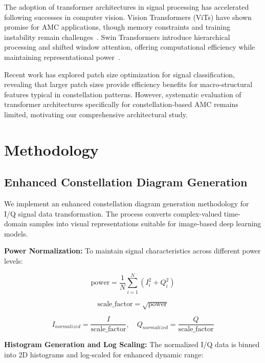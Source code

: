 \documentclass{ELSP}
\begin{document}
The adoption of transformer architectures in signal processing has accelerated following successes in computer vision. Vision Transformers (ViTs) have shown promise for AMC applications, though memory constraints and training instability remain challenges~\cite{vit2020}. Swin Transformers introduce hierarchical processing and shifted window attention, offering computational efficiency while maintaining representational power~\cite{swin2021}.

Recent work has explored patch size optimization for signal classification, revealing that larger patch sizes provide efficiency benefits for macro-structural features typical in constellation patterns. However, systematic evaluation of transformer architectures specifically for constellation-based AMC remains limited, motivating our comprehensive architectural study.

\section{Methodology}

\subsection{Enhanced Constellation Diagram Generation}

We implement an enhanced constellation diagram generation methodology for I/Q signal data transformation. The process converts complex-valued time-domain samples into visual representations suitable for image-based deep learning models.

\textbf{Power Normalization:} To maintain signal characteristics across different power levels:

\begin{equation}
\text{power} = \frac{1}{N} \sum_{i=1}^{N} (I_i^2 + Q_i^2)
\end{equation}

\begin{equation}
\text{scale\_factor} = \sqrt{\text{power}}
\end{equation}

\begin{equation}
I_{normalized} = \frac{I}{\text{scale\_factor}}, \quad Q_{normalized} = \frac{Q}{\text{scale\_factor}}
\end{equation}

\textbf{Histogram Generation and Log Scaling:} The normalized I/Q data is binned into 2D histograms and log-scaled for enhanced dynamic range:
\end{document}
